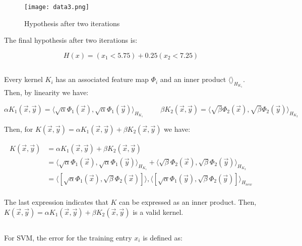 \documentclass[11pt]{article}
\begin{document}
\begin{figure}[H]
  \caption{Hypothesis after two iterations}
  \texttt{[image: data3.png]}
  \centering
\end{figure}

The final hypothesis after two iterations is: 

$$H(x)=(x_1<5.75) + 0.25(x_2<7.25)$$

\subsection{}

Every kernel $K_i$ has an associated feature map $\Phi_i$ and an inner product $\langle \rangle_{H_{K_1}}$. Then, by linearity we have:

$$\alpha K_1(\vec{x}, \vec{y}) = \langle \sqrt{\alpha}\Phi_1(\vec{x}), \sqrt{\alpha}\Phi_1(\vec{y}) \rangle_{H_{K_1}} \hspace{1cm} \beta K_2(\vec{x}, \vec{y}) = \langle \sqrt{\beta}\Phi_2(\vec{x}), \sqrt{\beta}\Phi_2(\vec{y}) \rangle_{H_{K_2}}$$

Then, for $K(\vec{x}, \vec{y})=\alpha K_1(\vec{x}, \vec{y})+\beta K_2(\vec{x}, \vec{y})$ we have:

\begin{align*} 
K(\vec{x}, \vec{y})&=\alpha K_1(\vec{x}, \vec{y})+\beta K_2(\vec{x}, \vec{y})\\
&=\langle \sqrt{\alpha}\Phi_1(\vec{x}), \sqrt{\alpha}\Phi_1(\vec{y}) \rangle_{H_{K_1}} + \langle \sqrt{\beta}\Phi_2(\vec{x}), \sqrt{\beta}\Phi_2(\vec{y}) \rangle_{H_{K_2}}\\
&=\langle [\sqrt{\alpha}\Phi_1(\vec{x}), \sqrt{\beta}\Phi_2(\vec{x})] \rangle, \langle [\sqrt{\alpha}\Phi_1(\vec{y}), \sqrt{\beta}\Phi_2(\vec{y})] \rangle_{H_{new}}\\
\end{align*}

The last expression indicates that $K$ can be expressed as an inner product. Then, $K(\vec{x}, \vec{y})=\alpha K_1(\vec{x}, \vec{y})+\beta K_2(\vec{x}, \vec{y})$ is a valid kernel.

\subsection{}
For SVM, the error for the training entry $x_i$ is defined as:
\end{document}
